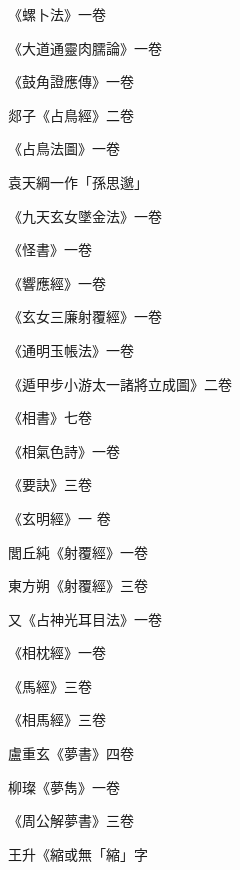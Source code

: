 \begin{pinyinscope}
 《螺卜法》一卷



 《大道通靈肉臑論》一卷



 《鼓角證應傳》一卷



 郯子《占鳥經》二卷



 《占鳥法圖》一卷



 袁天綱一作「孫思邈」



 《九天玄女墜金法》一卷



 《怪書》一卷



 《響應經》一卷



 《玄女三廉射覆經》一卷



 《通明玉帳法》一卷



 《遁甲步小游太一諸將立成圖》二卷



 《相書》七卷



 《相氣色詩》一卷



 《要訣》三卷



 《玄明經》一
 卷



 閭丘純《射覆經》一卷



 東方朔《射覆經》三卷



 又《占神光耳目法》一卷



 《相枕經》一卷



 《馬經》三卷



 《相馬經》三卷



 盧重玄《夢書》四卷



 柳璨《夢雋》一卷



 《周公解夢書》三卷



 王升《縮或無「縮」字




\end{pinyinscope}
